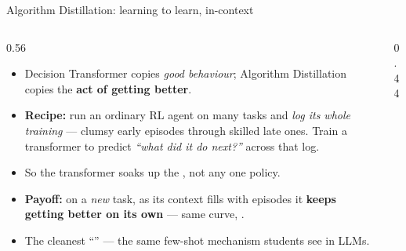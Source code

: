 \begin{frame}{Algorithm Distillation: learning to learn, in-context}
\begin{columns}[c]
\begin{column}{0.56\textwidth}
\begin{itemize}\footnotesize\itemsep0.4em
    \item Decision Transformer copies \emph{good behaviour}; Algorithm Distillation copies
          the \textbf{act of getting better}.
    \item \textbf{Recipe:} run an ordinary RL agent on many tasks and \emph{log its whole
          training} --- clumsy early episodes through skilled late ones. Train a transformer
          to predict \emph{``what did it do next?''} across that log.
    \item So the transformer soaks up the , not any one policy.
    \item \textbf{Payoff:} on a \emph{new} task, as its context fills with episodes it
          \textbf{keeps getting better on its own} --- same curve, .
    \item The cleanest ``'' --- the same
          few-shot mechanism students see in LLMs.
\end{itemize}
\end{column}
\begin{column}{0.44\textwidth}
\centering
{}
\end{column}
\end{columns}
\end{frame}
